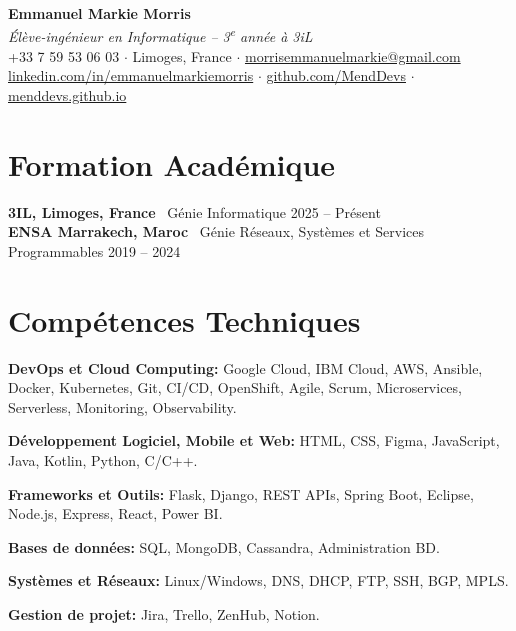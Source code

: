 \documentclass[10pt, letterpaper]{article}
\begin{document}
\begin{center}
\textbf{\LARGE Emmanuel Markie Morris} \\
\vspace{2pt}
\normalsize
\textit{\'El\`eve-ing\'enieur en Informatique -- 3\textsuperscript{e} ann\'ee \`a 3iL} \\
+33 7 59 53 06 03 $\cdot$ Limoges, France $\cdot$ 
\href{mailto:morrisemmanuelmarkie@gmail.com}{morrisemmanuelmarkie@gmail.com} \\
\href{https://www.linkedin.com/in/emmanuelmarkiemorris}{linkedin.com/in/emmanuelmarkiemorris} $\cdot$
\href{https://github.com/MendDevs}{github.com/MendDevs} $\cdot$
\href{https://menddevs.github.io}{menddevs.github.io}
\end{center}

\section*{Formation Acad\'emique}
\textbf{3IL, Limoges, France} \
G\'enie Informatique \hfill 2025 -- Pr\'esent \\
\textbf{ENSA Marrakech, Maroc} \
G\'enie R\'eseaux, Syst\`emes et Services Programmables \hfill 2019 -- 2024

\section*{Comp\'etences Techniques}
\textbf{DevOps et Cloud Computing:} Google Cloud, IBM Cloud, AWS, Ansible, Docker, Kubernetes, Git, CI/CD, OpenShift, Agile, Scrum, Microservices, Serverless, Monitoring, Observability.

\vspace{2.1mm}
\textbf{D\'eveloppement Logiciel, Mobile et Web:} HTML, CSS, Figma, JavaScript, Java, Kotlin, Python, C/C++.

\vspace{2.1mm}
\textbf{Frameworks et Outils:} Flask, Django, REST APIs, Spring Boot, Eclipse, Node.js, Express, React, Power BI.

\vspace{2.1mm}
\textbf{Bases de donn\'ees:} SQL, MongoDB, Cassandra, Administration BD.

\vspace{2.1mm}
\textbf{Syst\`emes et R\'eseaux:} Linux/Windows, DNS, DHCP, FTP, SSH, BGP, MPLS.

\vspace{2.1mm}
\textbf{Gestion de projet:} Jira, Trello, ZenHub, Notion.
\end{document}
